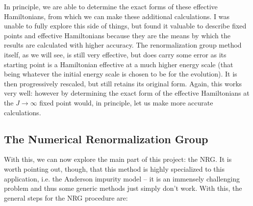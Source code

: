 In principle, we are able to determine the exact forms of these effective Hamiltonians, from which we can make these additional calculations. I was unable to fully explore this side of things, but found it valuable to describe fixed points and effective Hamiltonians because they are the means by which the results are calculated with higher accuracy. The renormalization group method itself, as we will see, is still very effective, but does carry some error as its starting point is a Hamiltonian effective at a much higher energy scale (that being whatever the initial energy scale is chosen to be for the evolution). It is then progressively rescaled, but still retains its original form. Again, this works very well: however by determining the exact form of the effective Hamiltonians at the $J\rightarrow\infty$ fixed point would, in principle, let us make more accurate calculations.


\subsection{The Numerical Renormalization Group}

With this, we can now explore the main part of this project: the NRG. It is worth pointing out, though, that this method is highly specialized to this application, i.e. the Anderson impurity model --  it is an immensely challenging problem and thus some generic methods just simply don't work. With this, the general steps for the NRG procedure are:

